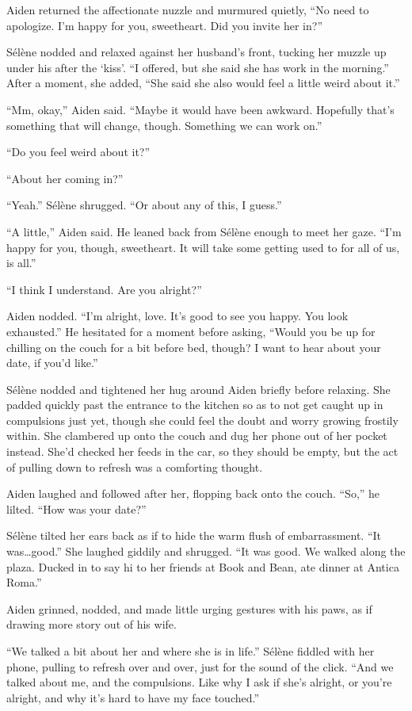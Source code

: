 Aiden returned the affectionate nuzzle and murmured quietly, ``No need to apologize. I'm happy for you, sweetheart. Did you invite her in?''

Sélène nodded and relaxed against her husband's front, tucking her muzzle up under his after the `kiss'. ``I offered, but she said she has work in the morning.'' After a moment, she added, ``She said she also would feel a little weird about it.''

``Mm, okay,'' Aiden said. ``Maybe it would have been awkward. Hopefully that's something that will change, though. Something we can work on.''

``Do you feel weird about it?''

``About her coming in?''

``Yeah.'' Sélène shrugged. ``Or about any of this, I guess.''

``A little,'' Aiden said. He leaned back from Sélène enough to meet her gaze. ``I'm happy for you, though, sweetheart. It will take some getting used to for all of us, is all.''

``I think I understand. Are you alright?''

Aiden nodded. ``I'm alright, love. It's good to see you happy. You look exhausted.'' He hesitated for a moment before asking, ``Would you be up for chilling on the couch for a bit before bed, though? I want to hear about your date, if you'd like.''

Sélène nodded and tightened her hug around Aiden briefly before relaxing. She padded quickly past the entrance to the kitchen so as to not get caught up in compulsions just yet, though she could feel the doubt and worry growing frostily within. She clambered up onto the couch and dug her phone out of her pocket instead. She'd checked her feeds in the car, so they should be empty, but the act of pulling down to refresh was a comforting thought.

Aiden laughed and followed after her, flopping back onto the couch. ``So,'' he lilted. ``How was your date?''

Sélène tilted her ears back as if to hide the warm flush of embarrassment. ``It was\ldots{}good.'' She laughed giddily and shrugged. ``It was good. We walked along the plaza. Ducked in to say hi to her friends at Book and Bean, ate dinner at Antica Roma.''

Aiden grinned, nodded, and made little urging gestures with his paws, as if drawing more story out of his wife.

``We talked a bit about her and where she is in life.'' Sélène fiddled with her phone, pulling to refresh over and over, just for the sound of the click. ``And we talked about me, and the compulsions. Like why I ask if she's alright, or you're alright, and why it's hard to have my face touched.''

